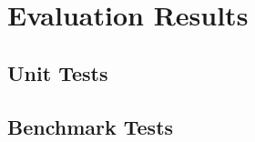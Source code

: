 \chapter{Evaluation Results}
\label{app:evaluation}

\section{Unit Tests}
\label{app:sec:test-results}

\section{Benchmark Tests}
\label{app:sec:benchmark-results}
